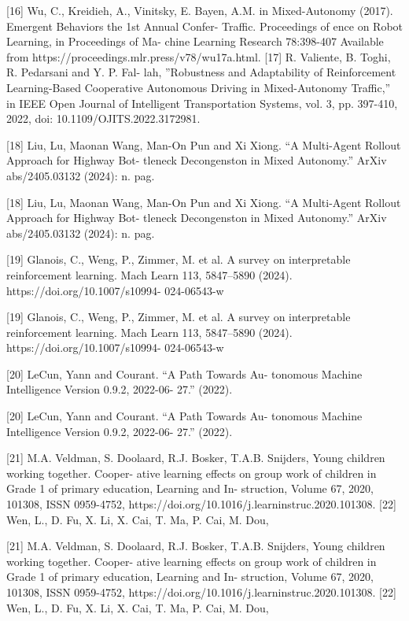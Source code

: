 \documentclass[12pt]{article}
\begin{document}
[16] Wu, C., Kreidieh, A., Vinitsky, E. Bayen, A.M.
in Mixed-Autonomy
(2017). Emergent Behaviors
the 1st Annual Confer-
Traffic. Proceedings of
ence on Robot Learning,
in Proceedings of Ma-
chine Learning Research 78:398-407 Available from
https://proceedings.mlr.press/v78/wu17a.html.
[17] R. Valiente, B. Toghi, R. Pedarsani and Y. P. Fal-
lah, ”Robustness and Adaptability of Reinforcement
Learning-Based Cooperative Autonomous Driving in
Mixed-Autonomy Traffic,” in IEEE Open Journal of
Intelligent Transportation Systems, vol. 3, pp. 397-410,
2022, doi: 10.1109/OJITS.2022.3172981.


[18] Liu, Lu, Maonan Wang, Man-On Pun and Xi Xiong.
“A Multi-Agent Rollout Approach for Highway Bot-
tleneck Decongenston in Mixed Autonomy.” ArXiv
abs/2405.03132 (2024): n. pag.


[18] Liu, Lu, Maonan Wang, Man-On Pun and Xi Xiong.
“A Multi-Agent Rollout Approach for Highway Bot-
tleneck Decongenston in Mixed Autonomy.” ArXiv
abs/2405.03132 (2024): n. pag.


[19] Glanois, C., Weng, P., Zimmer, M. et al. A survey on
interpretable reinforcement learning. Mach Learn 113,
5847–5890
(2024). https://doi.org/10.1007/s10994-
024-06543-w


[19] Glanois, C., Weng, P., Zimmer, M. et al. A survey on
interpretable reinforcement learning. Mach Learn 113,
5847–5890
(2024). https://doi.org/10.1007/s10994-
024-06543-w


[20] LeCun, Yann and Courant. “A Path Towards Au-
tonomous Machine Intelligence Version 0.9.2, 2022-06-
27.” (2022).


[20] LeCun, Yann and Courant. “A Path Towards Au-
tonomous Machine Intelligence Version 0.9.2, 2022-06-
27.” (2022).


[21] M.A. Veldman, S. Doolaard, R.J. Bosker, T.A.B.
Snijders, Young children working together. Cooper-
ative learning effects on group work of children in
Grade 1 of primary education, Learning and In-
struction, Volume 67, 2020, 101308, ISSN 0959-4752,
https://doi.org/10.1016/j.learninstruc.2020.101308.
[22] Wen, L., D. Fu, X. Li, X. Cai, T. Ma, P. Cai, M. Dou,


[21] M.A. Veldman, S. Doolaard, R.J. Bosker, T.A.B.
Snijders, Young children working together. Cooper-
ative learning effects on group work of children in
Grade 1 of primary education, Learning and In-
struction, Volume 67, 2020, 101308, ISSN 0959-4752,
https://doi.org/10.1016/j.learninstruc.2020.101308.
[22] Wen, L., D. Fu, X. Li, X. Cai, T. Ma, P. Cai, M. Dou,
\end{document}
